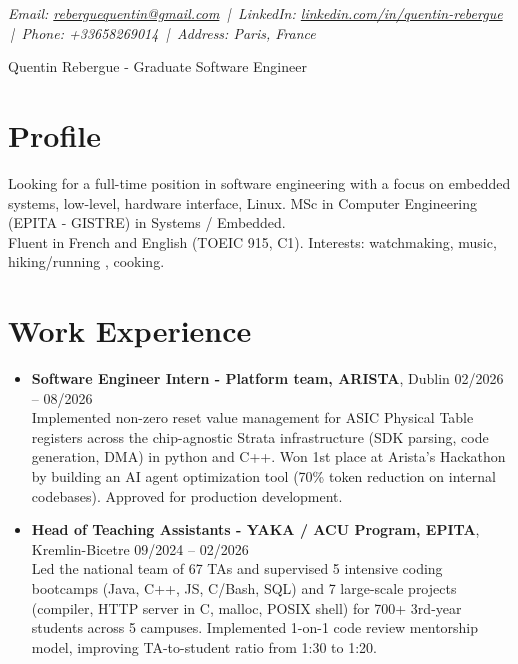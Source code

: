 \documentclass[9pt,a4paper]{article}
\newcommand{\namefont}{\fontsize{20}{22}\selectfont}
\newcommand{\tinyscript}{\fontsize{8}{9}\selectfont}
\begin{document}
\renewcommand\normalsize{\fontsize{10.5}{15}\selectfont}
\normalsize

\begin{center}
  {\tinyscript\itshape
  Email: \href{mailto:reberguequentin@gmail.com}{reberguequentin@gmail.com} \,|\,
  LinkedIn: \href{https://linkedin.com/in/quentin-rebergue}{linkedin.com/in/quentin-rebergue} \,|\,
  Phone: +33658269014 \,|\,
  Address: Paris, France}
\end{center}

\begin{center}
  {\namefont Quentin Rebergue - Graduate Software Engineer}
\end{center}

\section*{Profile}
\begin{tcolorbox}[mybox2]
Looking for a full-time position in software engineering with a focus on  embedded systems, low-level, hardware interface, Linux. MSc in Computer Engineering (EPITA - GISTRE) in Systems / Embedded.\\[0.3em]
Fluent in French and English (TOEIC 915, C1). Interests: watchmaking, music, hiking/running , cooking.
\end{tcolorbox}

\section*{Work Experience}
\begin{tcolorbox}[mybox]
\begin{itemize}
\item\textbf{Software Engineer Intern - Platform team, ARISTA}, Dublin \hfill {\small02/2026 – 08/2026}\\[0.5em]
\textcolor{gray!40!black}{Implemented non-zero reset value management for ASIC Physical Table registers across the chip-agnostic Strata infrastructure (SDK parsing, code generation, DMA) in python and C++.
Won 1st place at Arista's Hackathon by building an AI agent optimization tool (70\% token reduction on internal codebases). Approved for production development.}

\item\textbf{Head of Teaching Assistants - YAKA / ACU Program, EPITA}, Kremlin-Bicetre \hfill {\small09/2024 – 02/2026}\\[0.5em]
\textcolor{gray!40!black}{Led the national team of 67 TAs and supervised 5 intensive coding bootcamps (Java, C++, JS, C/Bash, SQL) and 7 large-scale projects (compiler, HTTP server in C, malloc, POSIX shell) for 700+ 3rd-year students across 5 campuses. Implemented 1-on-1 code review mentorship model, improving TA-to-student ratio from 1:30 to 1:20.}
\end{itemize}
\end{tcolorbox}
\end{document}
